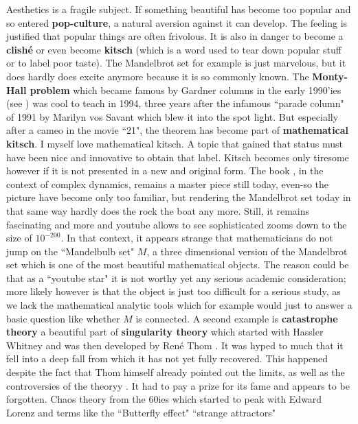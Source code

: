 \documentclass[12pt]{amsart}
\newcounter{example}    \def\example#1{ \item \fontsize{12}{15} \selectfont #1 \fontsize{12}{15} \selectfont }
\begin{document}
Aesthetics is a fragile subject. If something beautiful has become too popular and so 
entered {\bf pop-culture}, a natural aversion against it can develop. The feeling is
justified that popular things are often frivolous. It is also in danger to become a 
{\bf clish\'e} or even become {\bf kitsch} (which is a word used to tear down popular 
stuff or to label poor taste). The Mandelbrot
set for example is just marvelous, but it does hardly does excite anymore because it is so commonly
known. The {\bf Monty-Hall problem} which became famous by Gardner columns in the early 1990'ies
(see \cite{Snell95,Rosenhouse}) was cool to teach in 1994, three years after the infamous
``parade column" of 1991 by Marilyn vos Savant which blew it into the spot light. 
But especially after a cameo in the movie ``21", 
the theorem has become part of {\bf mathematical kitsch}. I myself love 
mathematical kitsch. A topic that gained that status must have been nice and innovative to obtain
that label. Kitsch becomes only tiresome however if it is not presented in a new and original form. 
The book \cite{PR}, in the context of complex dynamics, remains a master piece still 
today, even-so the picture have become only too familiar, but rendering the Mandelbrot set today in
that same way hardly does the rock the boat any more. 
Still, it remains fascinating and more and youtube allows to see sophisticated 
zooms down to the size of $10^{-200}$. In that context, it appears strange that mathematicians do not
jump on the ``Mandelbulb set" $M$, a three dimensional version of the Mandelbrot set
which is one of the most beautiful mathematical objects.
The reason could be that as a ``youtube star" it is not worthy yet any serious academic consideration;
more likely however is that the object is just too difficult for a serious study, as we lack the mathematical 
analytic tools which for example would just to answer a basic question like whether $M$ is connected.
A second example is {\bf catastrophe theory} \cite{StewartCatastrophe,ArnoldCatastrophe} a beautiful part
of {\bf singularity theory} which started with Hassler Whitney and was then developed by Ren\'e Thom
\cite{ThomMorphogenesis}.
It was hyped to much that it fell into a deep fall from which it has not yet fully recovered. 
This happened despite the fact that Thom himself already pointed out the limits, as well as the controversies 
of the theoryy \cite{Boutot1993}. It had to pay a prize for its fame and appears to be forgotten. 
Chaos theory from the 60ies which started to peak with Edward Lorenz and terms like
the ``Butterfly effect" ``strange attractors" 
\end{document}

